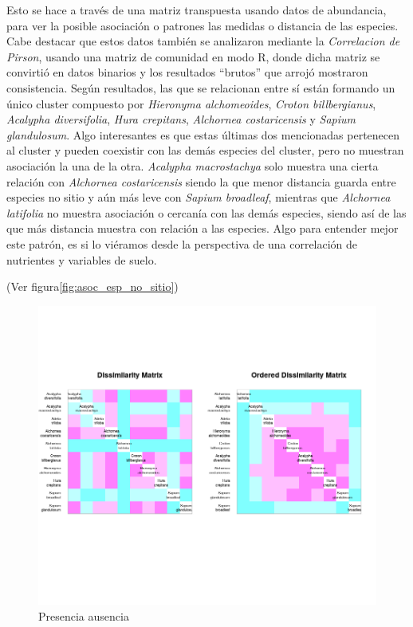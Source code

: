 \documentclass[11pt,]{article}
\begin{document}
Esto se hace a través de una matriz transpuesta usando datos de
abundancia, para ver la posible asociación o patrones las medidas o
distancia de las especies. Cabe destacar que estos datos también se
analizaron mediante la \emph{Correlacion de Pirson}, usando una matriz
de comunidad en modo R, donde dicha matriz se convirtió en datos
binarios y los resultados ``brutos'' que arrojó mostraron consistencia.
Según resultados, las que se relacionan entre sí están formando un único
cluster compuesto por \emph{Hieronyma alchomeoides}, \emph{Croton
billbergianus}, \emph{Acalypha diversifolia}, \emph{Hura crepitans},
\emph{Alchornea costaricensis} y \emph{Sapium glandulosum}. Algo
interesantes es que estas últimas dos mencionadas pertenecen al cluster
y pueden coexistir con las demás especies del cluster, pero no muestran
asociación la una de la otra. \emph{Acalypha macrostachya} solo muestra
una cierta relación con \emph{Alchornea costaricensis} siendo la que
menor distancia guarda entre especies no sitio y aún más leve con
\emph{Sapium broadleaf}, mientras que \emph{Alchornea latifolia} no
muestra asociación o cercanía con las demás especies, siendo así de las
que más distancia muestra con relación a las especies. Algo para
entender mejor este patrón, es si lo viéramos desde la perspectiva de
una correlación de nutrientes y variables de suelo.

(Ver figura\ref{fig:asoc_esp_no_sitio})

\begin{figure}
\centering
\includegraphics{asoc_esp_no_sitio.png}
\caption{\label{fig:asoc_esp_sitio}Presencia ausencia}
\end{figure}
\end{document}
